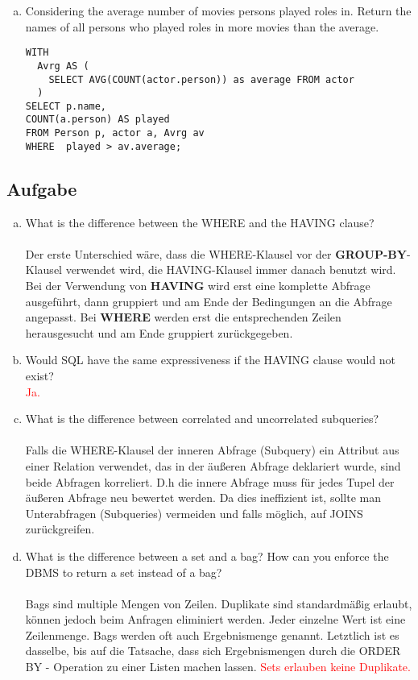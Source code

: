 \documentclass[11pt,a4paper,DIV=9]{scrartcl}
\newcounter{temp}
\newcommand{\aufgabe}[1]{
  \setcounter{temp}{\value{subsection}}
  \setcounter{subsection}{#1}
  \addtocounter{subsection}{-1}
  \subsection{Aufgabe}
  \setcounter{subsection}{\value{temp}}
}
\begin{document}
\begin{enumerate}[a.]
      \item Considering the average number of movies persons played roles in. Return the names of all persons who played roles in more movies than the average.\hfill
\begin{lstlisting}
WITH 
  Avrg AS (
    SELECT AVG(COUNT(actor.person)) as average FROM actor
  ) 
SELECT p.name, 
COUNT(a.person) AS played 
FROM Person p, actor a, Avrg av 
WHERE  played > av.average; 
\end{lstlisting}

      
    \end{enumerate}
\aufgabe{2}
\begin{enumerate}[a.]
\item What is the difference between the WHERE and the HAVING clause? \hfill\\\\
 Der erste Unterschied w\"are, dass die WHERE-Klausel vor der \textbf{GROUP-BY}-Klausel verwendet wird, die HAVING-Klausel immer danach benutzt wird. Bei der Verwendung von \textbf{HAVING} wird erst eine komplette Abfrage ausgef\"uhrt, dann gruppiert und am Ende der Bedingungen an die Abfrage angepasst. Bei \textbf{WHERE} werden erst die entsprechenden Zeilen herausgesucht und am Ende gruppiert zur\"uckgegeben. \\
\item Would SQL have the same expressiveness if the HAVING clause would not exist? \hfill\\
\textcolor{red}{Ja.} \\
\item What is the difference between correlated and uncorrelated subqueries? \hfill\\\\
Falls die WHERE-Klausel der inneren Abfrage (Subquery) ein Attribut aus einer Relation verwendet, das in der \"au{\ss}eren Abfrage deklariert wurde, sind beide Abfragen korreliert. D.h die innere Abfrage muss f\"ur jedes Tupel der \"au{\ss}eren Abfrage neu bewertet werden. Da dies ineffizient ist, sollte man Unterabfragen (Subqueries) vermeiden und falls m\"oglich, auf JOINS zur\"uckgreifen. \\
\item What is the difference between a set and a bag? How can you enforce the DBMS to return a set instead of a bag? \\\\
Bags sind multiple Mengen von Zeilen. Duplikate sind standardm\"a{\ss}ig erlaubt, k\"onnen jedoch beim Anfragen eliminiert werden. Jeder einzelne Wert ist eine Zeilenmenge. Bags werden oft auch Ergebnismenge genannt. Letztlich ist es dasselbe, bis auf die Tatsache, dass sich Ergebnismengen durch die ORDER BY - Operation zu einer Listen machen lassen.
\textcolor{red}{Sets erlauben keine Duplikate.}

 \end{enumerate}
\end{document}
